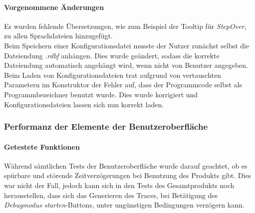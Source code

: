\documentclass[parskip=full]{scrartcl}
\begin{document}
\paragraph{Vorgenommene Änderungen}
Es wurden fehlende Übersetzungen, wie zum Beispiel der Tooltip für \textit{StepOver}, zu allen Sprachdateien hinzugefügt. \\
Beim Speichern einer Konfigurationsdatei musste der Nutzer zunächst selbst die Dateiendung \textit{.rdbf} anhängen. Dies wurde geändert, sodass die korrekte Dateiendung automatisch angehängt wird, wenn nicht von Benutzer angegeben. \\ 
Beim Laden von Konfigurationsdateien trat aufgrund von vertauschten Parametern im Konstruktor der Fehler auf, dass der Programmcode selbst als Programmbezeichner benutzt wurde. Dies wurde korrigiert und Konfigurationsdateien lassen sich nun korrekt laden.
\subsubsection{Performanz der Elemente der Benutzeroberfläche}
\paragraph{Getestete Funktionen}
Während sämtlichen Tests der Benutzeroberfläche wurde darauf geachtet, ob es spürbare und störende Zeitverzögerungen bei Benutzung des Produkts gibt. Dies war nicht der Fall, jedoch kann sich in den Tests des Gesamtprodukts noch herausstellen, dass sich das Generieren des Traces, bei Betätigung des \textit{Debugmodus starten}-Buttons, unter ungünstigen Bedingungen verzögern kann.

\label{testszenarien}
\end{document}

